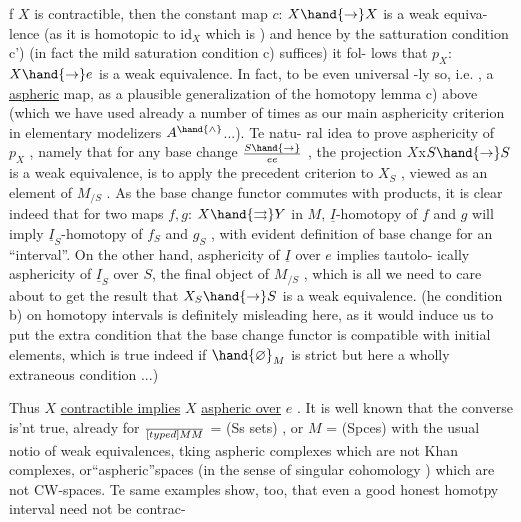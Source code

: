 f $X$ is contractible,  then the constant map $c$: $X\hand{\to} X$ is a weak equiva-%
lence (as it is homotopic to $\mathrm{id}_X$ which is )  and hence by the satturation
condition c') (in fact the mild saturation condition c) suffices) it fol-%
lows that $p_X$: $X\hand{\to} e$ is a weak equivalence.  In fact,  to be even universal
-ly so,  i.e. ,  a \uline{aspheric} map,  as a plausible generalization of the
homotopy lemma c)  above (which we have used already a number of times as
our main asphericity criterion in elementary modelizers $A^{\hand{\wedge}}$...).  Te natu-%
ral idea to prove asphericity of $p_X$ ,  namely that for any base change
$S\hand{\to} \over{e}{e}$ ,  the projection  $X$x$S\hand{\to} S$ is a weak equivalence,  is to apply
the precedent criterion  to $X_S$ , viewed as an element of $M_{/S}$ .  As the
base change functor commutes with products,  it is clear indeed that
for two maps $f,g$:  $X \hand{\rightrightarrows} Y$  in $M$,  $\underline{I}$-homotopy of $f$ and $g$ will imply
$\underline{I}_S$-homotopy of $f_S$ and $g_S$ ,  with evident definition of base change for an
``interval''.  On the other hand,  asphericity of $\underline{I}$ over $e$ implies tautolo-%
ically asphericity of $\underline{I}_S$ over $S$,  the final object of $M_{/S}$ ,  which is all
we need to care about to get the result that $X_S\hand{\to} S$ is a weak equivalence.
(he condition b) on homotopy intervals is definitely misleading here,  as
it would induce us to put the extra condition that the base change functor
is compatible with initial elements,  which is true indeed if $\hand{\varnothing}_M$ is strict\hand{,}
but here a wholly extraneous condition ...)

Thus $X$ \uline{contractible implies} $X$ \uline{aspheric over} $e$ .  It is well known
that the converse is'nt true,  already for  $\over[typed]{M}{M}$ = (Ss sets) , or
$M$ = (Spces)  with the usual notio of weak equivalences,  tking aspheric
complexes which are not Khan complexes,  or``aspheric''spaces (in the sense
of singular cohomology )  which are not CW-spaces.  Te same examples
show, too,  that even a good honest homotpy interval need not be contrac-%

